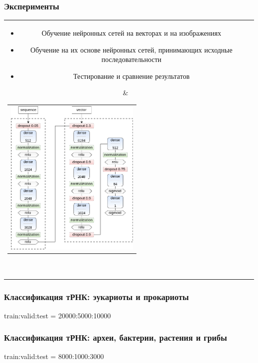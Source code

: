 \documentclass{beamer}
\begin{document}
\begin{frame}\frametitle{Эксперименты}
\begin{tabular}{cl}  
    \parbox{0.41\linewidth}{
        \begin{itemize}
            \item Обучение нейронных сетей на векторах и на изображениях
            \item Обучение на их основе нейронных сетей, принимающих исходные последовательности
            \item Тестирование и сравнение результатов
        \end{itemize}
    }
    & \begin{tabular}{l}
            \includegraphics[width=6.5cm]{pics/nn_arch.png}
         \end{tabular}  \\
\end{tabular}
\end{frame}

\begin{frame}\frametitle{Классификация тРНК: эукариоты и прокариоты}
train:valid:test = 20000:5000:10000


\end{frame}

\begin{frame}\frametitle{Классификация тРНК: археи, бактерии, растения и грибы}
train:valid:test = 8000:1000:3000


\end{frame}
\end{document}
